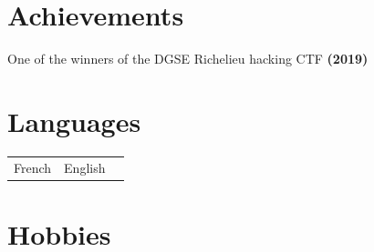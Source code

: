 \documentclass[a4paper,10pt]{article}
\begin{document}
\begin{adjustbox}{valign=t}
\begin{minipage}{0.6\textwidth}

\section*{Achievements}
\begin{spacing}{1.0}
    \raggedright
    One of the winners of the DGSE Richelieu hacking CTF \textbf{(2019)}
\end{spacing}
\vspace{-1.0mm}

\setlength{\columnsep}{-2cm}
\begin{multicols}{2}

\section*{Languages}
\begin{tabular}{ll}
    French & 
    English & 
\end{tabular}

\vfill\null \columnbreak  %

\section*{Hobbies}


\end{multicols}
\end{minipage}
\end{adjustbox}
\end{document}
